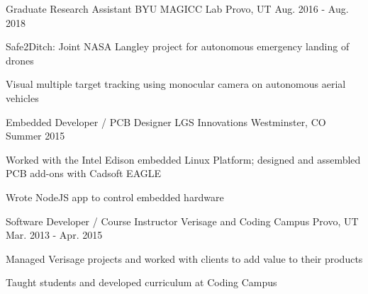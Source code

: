 

\begin{cventries}

  \cventry
    {Graduate Research Assistant} %
    {BYU MAGICC Lab} %
    {Provo, UT} %
    {Aug. 2016 - Aug. 2018} %
    {
      \begin{cvitems} %
        \item Safe2Ditch: Joint NASA Langley project for autonomous emergency landing of drones
        \item Visual multiple target tracking using monocular camera on autonomous aerial vehicles
      \end{cvitems}
    }
    
\cventry
	{Embedded Developer / PCB Designer} %
	{LGS Innovations} %
	{Westminster, CO} %
	{Summer 2015} %
	{
		\begin{cvitems} %
			\item Worked with the Intel Edison embedded Linux Platform; designed and assembled PCB add-ons with Cadsoft EAGLE
			\item Wrote NodeJS app to control embedded hardware
		\end{cvitems}
	}
	
\cventry
	{Software Developer / Course Instructor} %
	{Verisage and Coding Campus} %
	{Provo, UT} %
	{Mar. 2013 - Apr. 2015} %
	{
		\begin{cvitems} %
			\item Managed Verisage projects and worked with clients to add value to their products
			\item Taught students and developed curriculum at Coding Campus
		\end{cvitems}
	}
\end{cventries}
